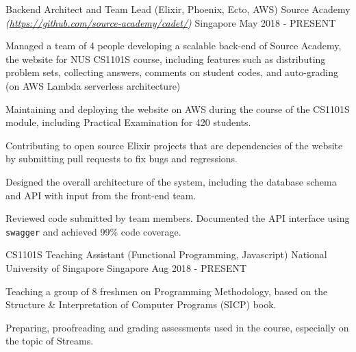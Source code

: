 \begin{cventries}
	\cventry
		{Backend Architect and Team Lead (Elixir, Phoenix, Ecto, AWS)} %
		{Source Academy \textmd{\em\tiny(\url{https://github.com/source-academy/cadet/})}} %
		{Singapore} %
		{May 2018 - PRESENT} %
		{
			\begin{cvitems}
        \item {Managed a team of 4 people developing a scalable back-end of Source Academy, the website for NUS CS1101S course, including features such as distributing problem sets, collecting answers, comments on student codes, and auto-grading (on AWS Lambda serverless architecture)}
				\item {Maintaining and deploying the website on AWS during the course of the CS1101S module, including Practical Examination for 420 students.}
        \item {Contributing to open source Elixir projects that are dependencies of the website by submitting pull requests to fix bugs and regressions.}
				\item {Designed the overall architecture of the system, including the database schema and API with input from the front-end team.}
				\item {Reviewed code submitted by team members. Documented the API interface using \texttt{swagger} and achieved 99\% code coverage.}
			\end{cvitems}
		}
	\cventry
		{CS1101S Teaching Assistant (Functional Programming, Javascript)} %
		{National University of Singapore} %
		{Singapore} %
		{Aug 2018 - PRESENT} %
		{
			\begin{cvitems}
				\item {Teaching a group of 8 freshmen on Programming Methodology, based on the Structure \& Interpretation of Computer Programs (SICP) book.}
				\item {Preparing, proofreading and grading assessments used in the course, especially on the topic of Streams.}
			\end{cvitems}
		}

\end{cventries}
